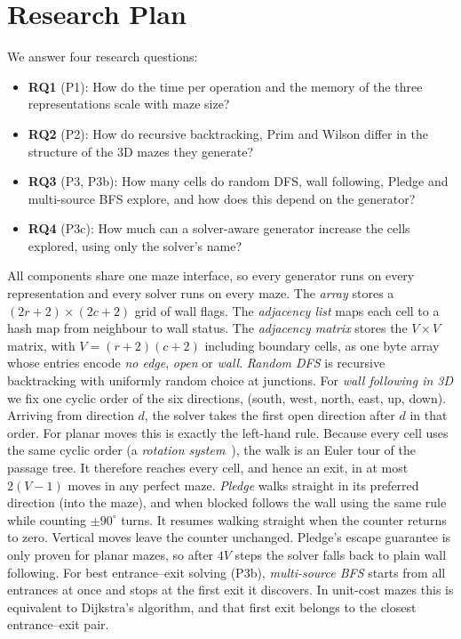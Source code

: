 \section{Research Plan}
\label{sec:plan}

We answer four research questions:
\begin{itemize}
  \item \textbf{RQ1} (P1): How do the time per operation and the memory of the three representations scale with maze size?
  \item \textbf{RQ2} (P2): How do recursive backtracking, Prim and Wilson differ in the structure of the 3D mazes they generate?
  \item \textbf{RQ3} (P3, P3b): How many cells do random DFS, wall following, Pledge and multi-source BFS explore, and how does this depend on the generator?
  \item \textbf{RQ4} (P3c): How much can a solver-aware generator increase the cells explored, using only the solver's name?
\end{itemize}

All components share one maze interface, so every generator runs on every representation and every solver runs on every maze.
The \emph{array} stores a $(2r+2)\times(2c+2)$ grid of wall flags.
The \emph{adjacency list} maps each cell to a hash map from neighbour to wall status.
The \emph{adjacency matrix} stores the $V\times V$ matrix, with $V=(r+2)(c+2)$ including boundary cells, as one byte array whose entries encode \emph{no edge}, \emph{open} or \emph{wall}.
\emph{Random DFS} is recursive backtracking with uniformly random choice at junctions.
For \emph{wall following in 3D} we fix one cyclic order of the six directions, (south, west, north, east, up, down).
Arriving from direction $d$, the solver takes the first open direction after $d$ in that order.
For planar moves this is exactly the left-hand rule.
Because every cell uses the same cyclic order (a \emph{rotation system}~\cite{gross1987topological}), the walk is an Euler tour of the passage tree.
It therefore reaches every cell, and hence an exit, in at most $2(V-1)$ moves in any perfect maze.
\emph{Pledge} walks straight in its preferred direction (into the maze), and when blocked follows the wall using the same rule while counting $\pm 90^\circ$ turns.
It resumes walking straight when the counter returns to zero.
Vertical moves leave the counter unchanged.
Pledge's escape guarantee is only proven for planar mazes, so after $4V$ steps the solver falls back to plain wall following.
For best entrance--exit solving (P3b), \emph{multi-source BFS} starts from all entrances at once and stops at the first exit it discovers.
In unit-cost mazes this is equivalent to Dijkstra's algorithm, and that first exit belongs to the closest entrance--exit pair.

